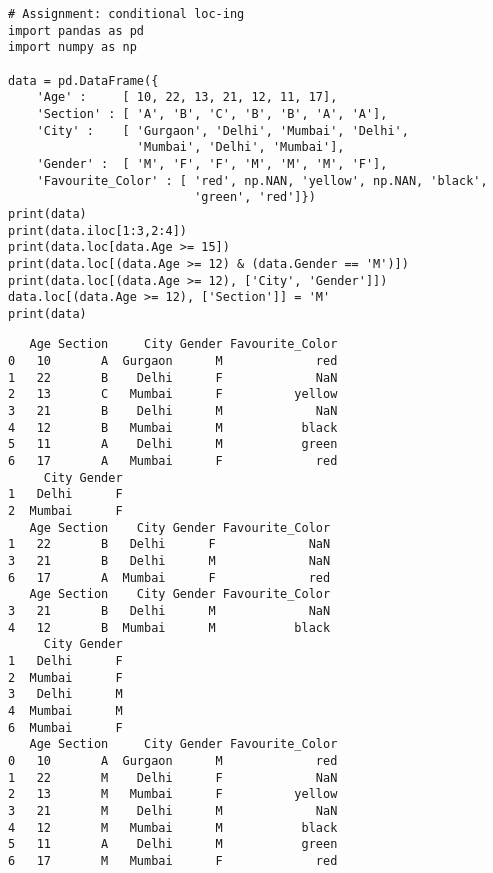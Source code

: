 \documentclass[11pt]{article}
\begin{document}
\begin{verbatim}
# Assignment: conditional loc-ing
import pandas as pd
import numpy as np

data = pd.DataFrame({
    'Age' :     [ 10, 22, 13, 21, 12, 11, 17],
    'Section' : [ 'A', 'B', 'C', 'B', 'B', 'A', 'A'],
    'City' :    [ 'Gurgaon', 'Delhi', 'Mumbai', 'Delhi',
                  'Mumbai', 'Delhi', 'Mumbai'],
    'Gender' :  [ 'M', 'F', 'F', 'M', 'M', 'M', 'F'],
    'Favourite_Color' : [ 'red', np.NAN, 'yellow', np.NAN, 'black',
                          'green', 'red']})
print(data)
print(data.iloc[1:3,2:4])
print(data.loc[data.Age >= 15])
print(data.loc[(data.Age >= 12) & (data.Gender == 'M')])
print(data.loc[(data.Age >= 12), ['City', 'Gender']])
data.loc[(data.Age >= 12), ['Section']] = 'M'
print(data)
\end{verbatim}

\begin{verbatim}
   Age Section     City Gender Favourite_Color
0   10       A  Gurgaon      M             red
1   22       B    Delhi      F             NaN
2   13       C   Mumbai      F          yellow
3   21       B    Delhi      M             NaN
4   12       B   Mumbai      M           black
5   11       A    Delhi      M           green
6   17       A   Mumbai      F             red
     City Gender
1   Delhi      F
2  Mumbai      F
   Age Section    City Gender Favourite_Color
1   22       B   Delhi      F             NaN
3   21       B   Delhi      M             NaN
6   17       A  Mumbai      F             red
   Age Section    City Gender Favourite_Color
3   21       B   Delhi      M             NaN
4   12       B  Mumbai      M           black
     City Gender
1   Delhi      F
2  Mumbai      F
3   Delhi      M
4  Mumbai      M
6  Mumbai      F
   Age Section     City Gender Favourite_Color
0   10       A  Gurgaon      M             red
1   22       M    Delhi      F             NaN
2   13       M   Mumbai      F          yellow
3   21       M    Delhi      M             NaN
4   12       M   Mumbai      M           black
5   11       A    Delhi      M           green
6   17       M   Mumbai      F             red
\end{verbatim}
\end{document}
